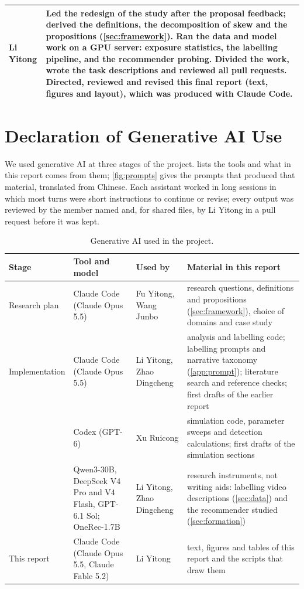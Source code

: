 \begin{table}[H]
\begin{tabularx}{\textwidth}{@{}L{2.35cm} Y@{}}
\addlinespace
Li Yitong & Led the redesign of the study after the proposal feedback; derived the definitions, the decomposition of skew and the propositions (\cref{sec:framework}). Ran the data and model work on a GPU server: exposure statistics, the labelling pipeline, and the recommender probing. Divided the work, wrote the task descriptions and reviewed all pull requests. Directed, reviewed and revised this final report (text, figures and layout), which was produced with Claude Code.\\
\bottomrule
\end{tabularx}
\end{table}


\section{Declaration of Generative AI Use}
\label{sec:ai}

We used generative AI at three stages of the project.  lists the tools and what in this report comes from them; \cref{fig:prompts} gives the prompts that produced that material, translated from Chinese. Each assistant worked in long sessions in which most turns were short instructions to continue or revise; every output was reviewed by the member named and, for shared files, by Li Yitong in a pull request before it was kept.

\begin{table}[H]
\caption{Generative AI used in the project.}
\label{tab:ai}
\centering\small
\begin{tabularx}{\textwidth}{@{}L{2.0cm} L{3.4cm} L{2.4cm} Y@{}}
\toprule
Stage & Tool and model & Used by & Material in this report\\
\midrule
Research plan & Claude Code (Claude Opus 5.5) & Fu Yitong, Wang Junbo & research questions, definitions and propositions (\cref{sec:framework}), choice of domains and case study\\
Implemen\-tation & Claude Code (Claude Opus 5.5) & Li Yitong, Zhao Dingcheng & analysis and labelling code; labelling prompts and narrative taxonomy (\cref{app:prompt}); literature search and reference checks; first drafts of the earlier report\\
 & Codex (GPT-6) & Xu Ruicong & simulation code, parameter sweeps and detection calculations; first drafts of the simulation sections\\
 & Qwen3-30B, DeepSeek V4 Pro and V4 Flash, GPT-6.1 Sol; OneRec-1.7B & Li Yitong, Zhao Dingcheng & research instruments, not writing aids: labelling video descriptions (\cref{sec:data}) and the recommender studied (\cref{sec:formation})\\
This report & Claude Code (Claude Opus 5.5, Claude Fable 5.2) & Li Yitong & text, figures and tables of this report and the scripts that draw them\\
\bottomrule
\end{tabularx}
\end{table}

